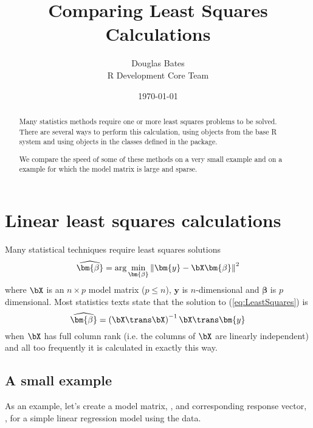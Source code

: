 \Rcodeplaceholder{}

\title{Comparing Least Squares Calculations}
\author{Douglas Bates\\R Development Core Team\\}
\date{\today}
\maketitle
\begin{abstract}
  Many statistics methods require one or more least squares problems
  to be solved.  There are several ways to perform this calculation,
  using objects from the base R system and using objects in the
  classes defined in the  package.

  We compare the speed of some of these methods on a very small
  example and on a example for which the model matrix is large and
  sparse.
\end{abstract}

\Rcodeplaceholder{}

\section{Linear least squares calculations}
\label{sec:LeastSquares}

Many statistical techniques require least squares solutions
\begin{equation}
  \label{eq:LeastSquares}
  \widehat{\bm{\beta}}=
  \arg\min_{\bm{\beta}}\left\|\bm{y}-\bX\bm{\beta}\right\|^2
\end{equation}
where $\bX$ is an $n\times p$ model matrix ($p\leq n$), $\bm{y}$ is
$n$-dimensional and $\bm{\beta}$ is $p$ dimensional.  Most statistics
texts state that the solution to (\ref{eq:LeastSquares}) is
\begin{equation}
  \label{eq:XPX}
  \widehat{\bm{\beta}}=\left(\bX\trans\bX\right)^{-1}\bX\trans\bm{y}
\end{equation}
when $\bX$ has full column rank (i.e. the columns of $\bX$ are
linearly independent) and all too frequently it is calculated in
exactly this way.


\subsection{A small example}
\label{sec:smallLSQ}

As an example, let's create a model matrix, , and corresponding
response vector, , for a simple linear regression model using
the  data.

